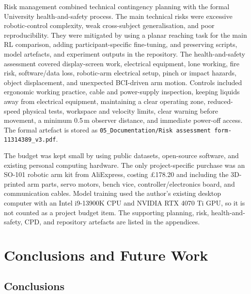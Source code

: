 \documentclass[12pt, a4paper]{article}
\begin{document}
Risk management combined technical contingency planning with the formal University health-and-safety process. The main technical risks were excessive robotic-control complexity, weak cross-subject generalisation, and poor reproducibility. They were mitigated by using a planar reaching task for the main RL comparison, adding participant-specific fine-tuning, and preserving scripts, model artefacts, and experiment outputs in the repository. The health-and-safety assessment covered display-screen work, electrical equipment, lone working, fire risk, software/data loss, robotic-arm electrical setup, pinch or impact hazards, object displacement, and unexpected BCI-driven arm motion. Controls included ergonomic working practice, cable and power-supply inspection, keeping liquids away from electrical equipment, maintaining a clear operating zone, reduced-speed physical tests, workspace and velocity limits, clear warning before movement, a minimum 0.5\,m observer distance, and immediate power-off access. The formal artefact is stored as \texttt{05\_Documentation/Risk assessment form-11314389\_v3.pdf}.

The budget was kept small by using public datasets, open-source software, and existing personal computing hardware. The only project-specific purchase was an SO-101 robotic arm kit from AliExpress, costing \pounds178.20 and including the 3D-printed arm parts, servo motors, bench vice, controller/electronics board, and communication cables. Model training used the author's existing desktop computer with an Intel i9-13900K CPU and NVIDIA RTX 4070 Ti GPU, so it is not counted as a project budget item. The supporting planning, risk, health-and-safety, CPD, and repository artefacts are listed in the appendices.

\section{Conclusions and Future Work}

\subsection{Conclusions}
\end{document}

